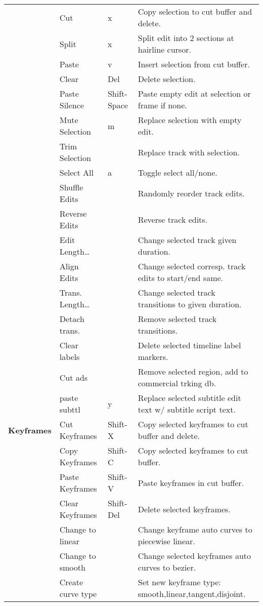 \begin{longtable}[h]{>{\bfseries}p{}p{}p{}p{}}
  & Cut & x & Copy selection to cut buffer and delete. \\
  & Split & x & Split edit into 2 sections at hairline cursor. \\
  & Paste & v & Insert selection from cut buffer. \\
  & Clear & Del & Delete selection. \\
  & Paste Silence & Shift-Space & Paste empty edit at selection or frame if none. \\
  & Mute Selection & m & Replace selection with empty edit. \\
  & Trim Selection &  & Replace track with selection. \\
  & Select All & a & Toggle select all/none. \\
  & Shuffle Edits &  & Randomly reorder track edits. \\
  & Reverse Edits &  & Reverse track edits. \\
  & Edit Length\dots &  & Change selected track given duration. \\
  & Align Edits &  & Change selected corresp. track edits to start/end same. \\
  & Trans. Length\dots &  & Change selected track transitions to given duration. \\
  & Detach trans. &  & Remove selected track transitions. \\
  & Clear labels &  & Delete selected timeline label markers. \\
  & Cut ads &  & Remove selected region, add to commercial trking db. \\
  & paste subttl & y & Replace selected subtitle edit text w/ subtitle script text. \\
  \midrule
  \textcolor{CinBlueText}{Keyframes} & Cut Keyframes & Shift-X & Copy selected keyframes to cut buffer and delete. \\
  & Copy Keyframes & Shift-C & Copy selected keyframes to cut buffer. \\
  & Paste Keyframes & Shift-V & Paste keyframes in cut buffer. \\
  & Clear Keyframes & Shift-Del & Delete selected keyframes. \\
  & Change to linear &  & Change keyframe auto curves to piecewise linear. \\
  & Change to smooth &  & Change selected keyframes auto curves to bezier. \\
  & Create curve type &  & Set new keyframe type: smooth,linear,tangent,disjoint. \\

\end{longtable}

